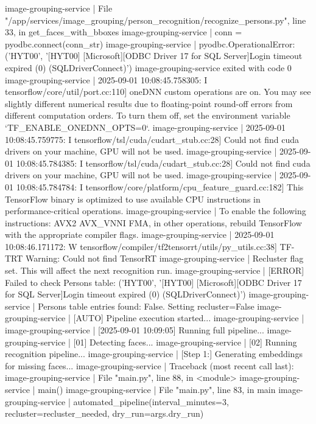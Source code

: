 image-grouping-service  |   File "/app/services/image_grouping/person_recognition/recognize_persons.py", line 33, in get_faces_with_bboxes
image-grouping-service  |     conn = pyodbc.connect(conn_str)
image-grouping-service  | pyodbc.OperationalError: ('HYT00', '[HYT00] [Microsoft][ODBC Driver 17 for SQL Server]Login timeout expired (0) (SQLDriverConnect)')
image-grouping-service exited with code 0
image-grouping-service  | 2025-09-01 10:08:45.758305: I tensorflow/core/util/port.cc:110] oneDNN custom operations are on. You may see slightly different numerical results due to floating-point round-off errors from different computation orders. To turn them off, set the environment variable `TF_ENABLE_ONEDNN_OPTS=0`.
image-grouping-service  | 2025-09-01 10:08:45.759775: I tensorflow/tsl/cuda/cudart_stub.cc:28] Could not find cuda drivers on your machine, GPU will not be used.
image-grouping-service  | 2025-09-01 10:08:45.784385: I tensorflow/tsl/cuda/cudart_stub.cc:28] Could not find cuda drivers on your machine, GPU will not be used.
image-grouping-service  | 2025-09-01 10:08:45.784784: I tensorflow/core/platform/cpu_feature_guard.cc:182] This TensorFlow binary is optimized to use available CPU instructions in performance-critical operations.
image-grouping-service  | To enable the following instructions: AVX2 AVX_VNNI FMA, in other operations, rebuild TensorFlow with the appropriate compiler flags.
image-grouping-service  | 2025-09-01 10:08:46.171172: W tensorflow/compiler/tf2tensorrt/utils/py_utils.cc:38] TF-TRT Warning: Could not find TensorRT
image-grouping-service  | Recluster flag set. This will affect the next recognition run.
image-grouping-service  | [ERROR] Failed to check Persons table: ('HYT00', '[HYT00] [Microsoft][ODBC Driver 17 for SQL Server]Login timeout expired (0) (SQLDriverConnect)')
image-grouping-service  | Persons table entries found: False. Setting recluster=False
image-grouping-service  | [AUTO] Pipeline execution started...
image-grouping-service  |
image-grouping-service  | [2025-09-01 10:09:05] Running full pipeline...
image-grouping-service  | [01] Detecting faces...
image-grouping-service  | [02] Running recognition pipeline...
image-grouping-service  | [Step 1:] Generating embeddings for missing faces...
image-grouping-service  | Traceback (most recent call last):
image-grouping-service  |   File "main.py", line 88, in <module>
image-grouping-service  |     main()
image-grouping-service  |   File "main.py", line 83, in main
image-grouping-service  |     automated_pipeline(interval_minutes=3, recluster=recluster_needed, dry_run=args.dry_run)
